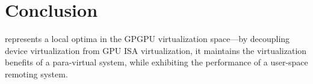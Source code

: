 \section{Conclusion}
\label{sec_con}

\Trillium represents a local optima in the GPGPU virtualization space---by decoupling device
virtualization from GPU ISA virtualization, it maintains the virtualization benefits of
a para-virtual system, while exhibiting the performance of a user-space remoting system.